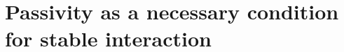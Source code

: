\documentclass[11pt]{article}
\makeatletter
\def\@qedsymbol{${}_\blacksquare$}
\def\qed{\@endgadget{\@qedsymbol}}
\newtheorem{pf}[lemma]{Proof}
\newcommand{\Ltwoe}{\boldsymbol{\rm L}_{2e}}
\makeatother
\begin{document}
%

\section{Passivity as a necessary condition for stable interaction} \label{sec: passivity}
\end{document}

